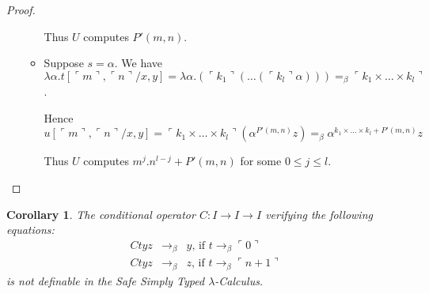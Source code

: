 \documentclass{article}
\newtheorem{corollary}[theorem]{Corollary}
\newcommand{\encode}[1]{\ulcorner #1 \urcorner}
\begin{document}
\begin{proof}
\begin{itemize}
\begin{itemize}
Thus $U$ computes $P'(m,n)$.

\item Suppose $s=\alpha$. 
We have
$\lambda \alpha . t[\encode{m}, \encode{n}/x,y] = \lambda \alpha . (\encode{k_1} (\ldots (\encode{k_l} \alpha))) =_\beta \encode{k_1 \times \ldots \times k_l}$.

Hence  $u[\encode{m}, \encode{n}/x,y] = \encode{k_1 \times \ldots \times k_l} (\alpha^{P'(m,n)} z)=_\beta \alpha^{k_1 \times \ldots \times k_l + P'(m,n)} z$

Thus $U$ computes $m^j . n^{l-j} + P'(m,n)$ for some $0\leq j \leq l$.
\end{itemize}
\end{itemize}
\end{proof}

\begin{corollary}
The conditional operator $C:I\rightarrow I\rightarrow I$ verifying the following equations:
\begin{eqnarray*}
C t y z &\rightarrow_\beta& y \mbox{, if } t \rightarrow_\beta \encode{0} \\
C t y z &\rightarrow_\beta& z \mbox{, if } t \rightarrow_\beta \encode{n+1}
\end{eqnarray*}
is not definable in the Safe Simply Typed $\lambda$-Calculus.
\end{corollary}





\end{document}
